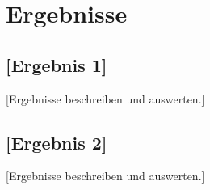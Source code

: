 \chapter{Ergebnisse}
\label{chap:ergebnisse}

\section{[Ergebnis 1]}

[Ergebnisse beschreiben und auswerten.]

\section{[Ergebnis 2]}

[Ergebnisse beschreiben und auswerten.]

